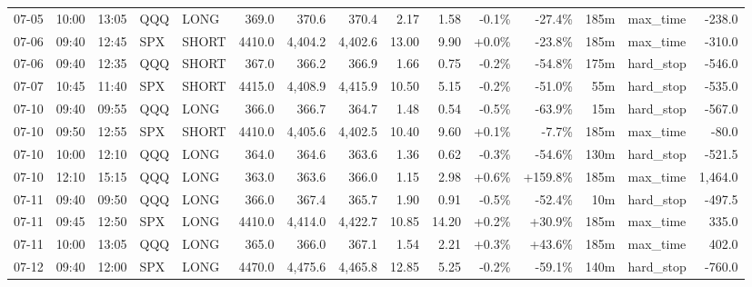 \documentclass[11pt,a4paper,twoside]{article}
\begin{document}
\begin{landscape}
\begin{center}
\begin{longtable}{>{\color{txtmain}}l l l l l r r r r r r r r >{\color{txtmain}}l r}
07-05 & 10:00 & 13:05 & QQQ & LONG & 369.0 & 370.6 & 370.4 & 2.17 & 1.58 & \textcolor{lossred}{-0.1\%} & \textcolor{lossred}{-27.4\%} & 185m & max\_time & \textcolor{lossred}{-238.0} \\
07-06 & 09:40 & 12:45 & SPX & SHORT & 4410.0 & 4,404.2 & 4,402.6 & 13.00 & 9.90 & \textcolor{wingreen}{+0.0\%} & \textcolor{lossred}{-23.8\%} & 185m & max\_time & \textcolor{lossred}{-310.0} \\
07-06 & 09:40 & 12:35 & QQQ & SHORT & 367.0 & 366.2 & 366.9 & 1.66 & 0.75 & \textcolor{lossred}{-0.2\%} & \textcolor{lossred}{-54.8\%} & 175m & hard\_stop & \textcolor{lossred}{-546.0} \\
07-07 & 10:45 & 11:40 & SPX & SHORT & 4415.0 & 4,408.9 & 4,415.9 & 10.50 & 5.15 & \textcolor{lossred}{-0.2\%} & \textcolor{lossred}{-51.0\%} & 55m & hard\_stop & \textcolor{lossred}{-535.0} \\
07-10 & 09:40 & 09:55 & QQQ & LONG & 366.0 & 366.7 & 364.7 & 1.48 & 0.54 & \textcolor{lossred}{-0.5\%} & \textcolor{lossred}{-63.9\%} & 15m & hard\_stop & \textcolor{lossred}{-567.0} \\
07-10 & 09:50 & 12:55 & SPX & SHORT & 4410.0 & 4,405.6 & 4,402.5 & 10.40 & 9.60 & \textcolor{wingreen}{+0.1\%} & \textcolor{lossred}{-7.7\%} & 185m & max\_time & \textcolor{lossred}{-80.0} \\
07-10 & 10:00 & 12:10 & QQQ & LONG & 364.0 & 364.6 & 363.6 & 1.36 & 0.62 & \textcolor{lossred}{-0.3\%} & \textcolor{lossred}{-54.6\%} & 130m & hard\_stop & \textcolor{lossred}{-521.5} \\
07-10 & 12:10 & 15:15 & QQQ & LONG & 363.0 & 363.6 & 366.0 & 1.15 & 2.98 & \textcolor{wingreen}{+0.6\%} & \textcolor{wingreen}{+159.8\%} & 185m & max\_time & \textcolor{wingreen}{1,464.0} \\
07-11 & 09:40 & 09:50 & QQQ & LONG & 366.0 & 367.4 & 365.7 & 1.90 & 0.91 & \textcolor{lossred}{-0.5\%} & \textcolor{lossred}{-52.4\%} & 10m & hard\_stop & \textcolor{lossred}{-497.5} \\
07-11 & 09:45 & 12:50 & SPX & LONG & 4410.0 & 4,414.0 & 4,422.7 & 10.85 & 14.20 & \textcolor{wingreen}{+0.2\%} & \textcolor{wingreen}{+30.9\%} & 185m & max\_time & \textcolor{wingreen}{335.0} \\
07-11 & 10:00 & 13:05 & QQQ & LONG & 365.0 & 366.0 & 367.1 & 1.54 & 2.21 & \textcolor{wingreen}{+0.3\%} & \textcolor{wingreen}{+43.6\%} & 185m & max\_time & \textcolor{wingreen}{402.0} \\
07-12 & 09:40 & 12:00 & SPX & LONG & 4470.0 & 4,475.6 & 4,465.8 & 12.85 & 5.25 & \textcolor{lossred}{-0.2\%} & \textcolor{lossred}{-59.1\%} & 140m & hard\_stop & \textcolor{lossred}{-760.0} \\

\end{longtable}
\end{center}
\end{landscape}
\end{document}
